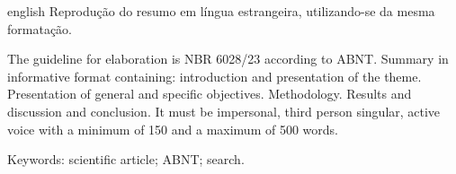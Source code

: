 \begin{resumo}[Abstract]
 \begin{otherlanguage*}{english}
    Reprodução do resumo em língua estrangeira, utilizando-se da mesma formatação.
    
    The guideline for elaboration is NBR 6028/23 according to ABNT. Summary in informative format containing: introduction and presentation of the theme. Presentation of general and specific objectives. Methodology. Results and discussion and conclusion. It must be impersonal, third person singular, active voice with a minimum of 150 and a maximum of 500 words.
    
    Keywords: scientific article; ABNT; search.
 \end{otherlanguage*}
\end{resumo}
